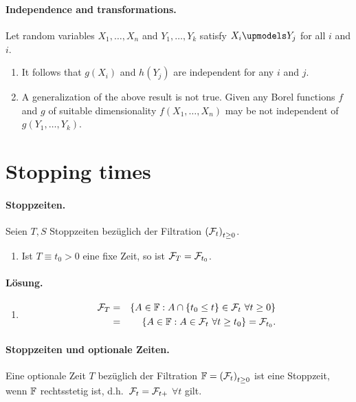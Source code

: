 \paragraph{Independence and transformations. } Let random variables
$X_1,\ldots,X_n$ and $Y_1,\ldots,Y_k$ satisfy $X_i \upmodels Y_j$ for all $i$
and $i$.
\begin{enumerate}
    \item It follows that $g(X_i)$ and $h(Y_j)$ are independent for any $i$ and
        $j$.
    \item A generalization of the above result is not true. Given any Borel
        functions $f$ and $g$ of suitable dimensionality $f(X_1,\ldots,X_n)$
        may be not independent of $g(Y_1,\ldots,Y_k)$.
\end{enumerate}



\section{Stopping times}

\paragraph{Stoppzeiten. } Seien $T,S$ Stoppzeiten bezüglich der Filtration
$\left( \mathcal F_t \right)_{t \geq 0}$. 
\begin{enumerate}
    \item Ist $T \equiv t_0>0$ eine fixe Zeit, so ist $\mathcal F_T=\mathcal F_{t_0}$.
\end{enumerate}

\paragraph*{Lösung. }
\begin{enumerate}
    \item \begin{eqnarray}
            \mathcal F_T &=& 
            \left\{ A\in\mathbb F : A \cap \left\{ t_0 \leq t \right\}\in\mathcal F_t \ \forall t\geq 0 \right\} \\
            &=& \left\{ A\in\mathbb F : A\in\mathcal F_t \ \forall t\geq t_0 \right\} = \mathcal F_{t_0}.
        \end{eqnarray}
\end{enumerate}


\paragraph{Stoppzeiten und optionale Zeiten. } Eine optionale Zeit $T$ bezüglich
der Filtration $\mathbb F=\left( \mathcal F_t \right)_{t \geq 0}$ ist eine Stoppzeit, wenn 
$\mathbb F$ rechtsstetig ist, d.h.\ $\mathcal F_t=\mathcal F_{t+}$ $\forall t$ gilt.

